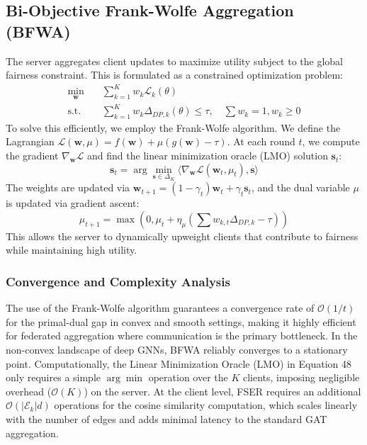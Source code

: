 \subsection{Bi-Objective Frank-Wolfe Aggregation (BFWA)}
The server aggregates client updates to maximize utility subject to the global fairness constraint. This is formulated as a constrained optimization problem:
\begin{align}
\min_{\mathbf{w}} \quad & \sum_{k=1}^K w_k \mathcal{L}_{k}(\theta) \\
\text{s.t.} \quad & \sum_{k=1}^K w_k \Delta_{DP, k}(\theta) \leq \tau, \quad \sum w_k = 1, w_k \geq 0
\end{align}
To solve this efficiently, we employ the Frank-Wolfe algorithm. We define the Lagrangian $\mathcal{L}(\mathbf{w}, \mu) = f(\mathbf{w}) + \mu (g(\mathbf{w}) - \tau)$. At each round $t$, we compute the gradient $\nabla_{\mathbf{w}} \mathcal{L}$ and find the linear minimization oracle (LMO) solution $\mathbf{s}_t$:
\begin{equation}
\mathbf{s}_t = \arg\min_{\mathbf{s} \in \Delta_K} \langle \nabla_{\mathbf{w}} \mathcal{L}(\mathbf{w}_t, \mu_t), \mathbf{s} \rangle
\end{equation}
The weights are updated via $\mathbf{w}_{t+1} = (1-\gamma_t)\mathbf{w}_t + \gamma_t \mathbf{s}_t$, and the dual variable $\mu$ is updated via gradient ascent:
\begin{equation}
\mu_{t+1} = \max(0, \mu_t + \eta_\mu (\sum w_{k,t} \Delta_{DP,k} - \tau))
\end{equation}
This allows the server to dynamically upweight clients that contribute to fairness while maintaining high utility.

\subsubsection*{Convergence and Complexity Analysis}
The use of the Frank-Wolfe algorithm guarantees a convergence rate of $\mathcal{O}(1/t)$ for the primal-dual gap in convex and smooth settings, making it highly efficient for federated aggregation where communication is the primary bottleneck. In the non-convex landscape of deep GNNs, BFWA reliably converges to a stationary point. Computationally, the Linear Minimization Oracle (LMO) in Equation 48 only requires a simple $\arg\min$ operation over the $K$ clients, imposing negligible overhead ($\mathcal{O}(K)$) on the server. At the client level, FSER requires an additional $\mathcal{O}(|\mathcal{E}_k| d)$ operations for the cosine similarity computation, which scales linearly with the number of edges and adds minimal latency to the standard GAT aggregation.

